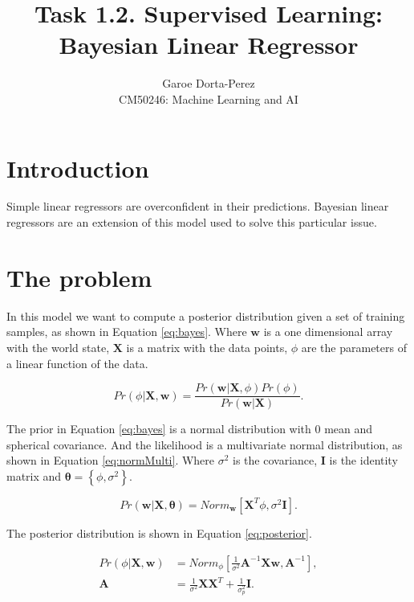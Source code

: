 \documentclass[12pt]{article}
\begin{document}
  
\title{Task 1.2. Supervised Learning:\\ Bayesian Linear Regressor}
\author{Garoe Dorta-Perez\\
CM50246: Machine Learning and AI}
 
\maketitle
 
\section{Introduction}

Simple linear regressors are overconfident in their predictions.
Bayesian linear regressors are an extension of this model used to solve this particular issue.

\section{The problem}

In this model we want to compute a posterior distribution given a set of training samples, as shown in Equation \ref{eq:bayes}. 
Where $\mathbf{w}$ is a one dimensional array with the world state, $\mathbf{X}$ is a matrix with the data points, $\phi$ are the parameters of a linear function of the data.

\begin{equation}
\label{eq:bayes}
Pr(\phi | \mathbf{X}, \mathbf{w} ) = \frac{ Pr(\mathbf{w} | \mathbf{X}, \phi) Pr(\phi)} {Pr(\mathbf{w} | \mathbf{X} )}.
\end{equation}

The prior in Equation \ref{eq:bayes} is a normal distribution with 0 mean and spherical covariance.
And the likelihood is a multivariate normal distribution, as shown in Equation \ref{eq:normMulti}.
Where  $\sigma^2$ is the covariance, $\mathbf{I}$ is the identity matrix and $\boldsymbol{\theta}= \left\{ \phi, \sigma^2 \right\}$.

\begin{equation}
\label{eq:normMulti}
Pr(\mathbf{w} | \mathbf{X}, \boldsymbol{\theta} ) = Norm_{\mathbf{w}}\left[ \mathbf{X}^T \phi, \sigma^2 \mathbf{I} \right].
\end{equation}

The posterior distribution is shown in Equation \ref{eq:posterior}.

\begin{equation}
\begin{split}
\label{eq:posterior}
Pr(\phi | \mathbf{X}, \mathbf{w} ) &= Norm_{\phi}\left[ \frac{1}{\sigma^2} \mathbf{A}^{-1} \mathbf{X} \mathbf{w}, \mathbf{A}^{-1} \right],\\
\mathbf{A} &= \frac{1}{\sigma^2} \mathbf{X} \mathbf{X}^T + \frac{1}{\sigma^2_p} \mathbf{I}.
\end{split}
\end{equation}
\end{document}
